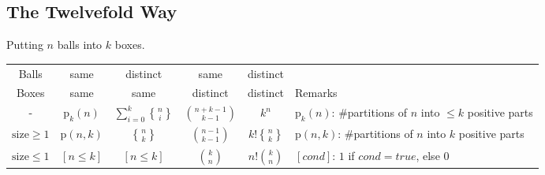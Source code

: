 \documentclass[15pt,a4paper]{article}
\DeclareRobustCommand{\stirling}{\genfrac\{\}{0pt}{}}
\begin{document}
\begin{landscape}
\begin{multicols*}{3}
    \subsection{The Twelvefold Way}
    Putting $n$ balls into $k$ boxes.\\
    \begin{tabular}{@{}c|c|c|c|c|l@{}}
        Balls & same & distinct & same & distinct & \\
        Boxes & same & same & distinct & distinct & Remarks\\
        \hline
        - & $\mathrm{p}_k(n)$ & $\sum_{i=0}^k \stirling{n}{i}$ & $\binom{n+k-1}{k-1}$ & $k^n$ & $\mathrm{p}_k(n)$: \#partitions of $n$ into $\le k$ positive parts \\
        $\mathrm{size}\ge 1$ & $\mathrm{p}(n,k)$ & $\stirling{n}{k}$ & $\binom{n-1}{k-1}$ & $k!\stirling{n}{k}$ & $\mathrm{p}(n,k)$: \#partitions of $n$ into $k$ positive parts \\
        $\mathrm{size}\le 1$ & $[n \le k]$ & $[n \le k]$ & $\binom{k}{n}$ & $n!\binom{k}{n}$ & $[cond]$: $1$ if $cond=true$, else $0$\\
        \bottomrule
    \end{tabular}


\end{multicols*}
\clearpage


\begin{multicols*}{3}
    

\end{multicols*}
\end{landscape}
\end{document}
